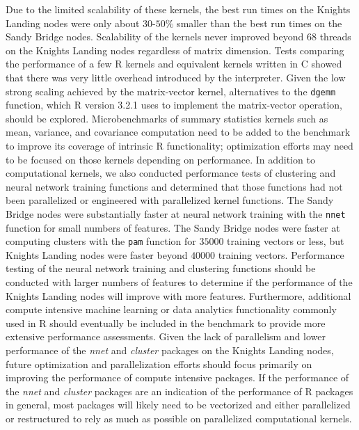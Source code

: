 Due to the limited scalability of these kernels, the best run times on the
  Knights Landing nodes were only about $30$-$50\%$ smaller than the best run
  times on the Sandy Bridge nodes.
Scalability of the kernels never improved beyond $68$ threads on the Knights
  Landing nodes regardless of matrix dimension.
Tests comparing the performance of a few R kernels and equivalent kernels
  written in C showed that there was very little overhead introduced by the
  interpreter.
Given the low strong scaling achieved by the matrix-vector kernel, alternatives
  to the \texttt{dgemm} function, which R version 3.2.1 uses to implement the
  matrix-vector operation, should be explored.
Microbenchmarks of summary statistics kernels such as mean, variance, and
  covariance computation need to be added to the benchmark to improve its
  coverage of intrinsic R functionality; optimization efforts may need to be
  focused on those kernels depending on performance.
In addition to computational kernels, we also conducted performance tests of
  clustering and neural network training functions and determined that those
  functions had not been parallelized or engineered with parallelized kernel
  functions.
The Sandy Bridge nodes were substantially faster at neural network training with
  the \texttt{nnet} function for small numbers of features.
The Sandy Bridge nodes were faster at computing clusters with the \texttt{pam}
  function for $35000$ training vectors or less, but Knights Landing nodes were
  faster beyond $40000$ training vectors.
Performance testing of the neural network training and clustering functions
  should be conducted with larger numbers of features to determine if the
  performance of the Knights Landing nodes will improve with more features.
Furthermore, additional compute intensive machine learning or data analytics
  functionality commonly used in R should eventually be included in the
  benchmark to provide more extensive performance assessments.
Given the lack of parallelism and lower performance of the \textit{nnet} and
  \textit{cluster} packages on the Knights Landing nodes, future optimization
  and parallelization efforts should focus primarily on improving the
  performance of compute intensive packages.
If the performance of the \textit{nnet} and \textit{cluster} packages are an
  indication of the performance of R packages in general, most packages will
  likely need to be vectorized and either parallelized or restructured to rely
  as much as possible on parallelized computational kernels.

%
%

